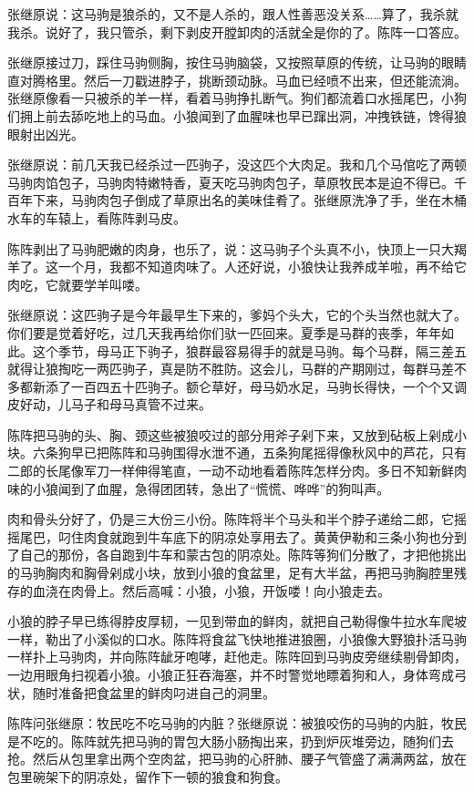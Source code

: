 \par 张继原说：这马驹是狼杀的，又不是人杀的，跟人性善恶没关系……算了，我杀就我杀。说好了，我只管杀，剩下剥皮开膛卸肉的活就全是你的了。陈阵一口答应。
\par 张继原接过刀，踩住马驹侧胸，按住马驹脑袋，又按照草原的传统，让马驹的眼睛直对腾格里。然后一刀戳进脖子，挑断颈动脉。马血已经喷不出来，但还能流淌。张继原像看一只被杀的羊一样，看着马驹挣扎断气。狗们都流着口水摇尾巴，小狗们拥上前去舔吃地上的马血。小狼闻到了血腥味也早已蹿出洞，冲拽铁链，馋得狼眼射出凶光。
\par 张继原说：前几天我已经杀过一匹驹子，没这匹个大肉足。我和几个马倌吃了两顿马驹肉馅包子，马驹肉特嫩特香，夏天吃马驹肉包子，草原牧民本是迫不得已。千百年下来，马驹肉包子倒成了草原出名的美味佳肴了。张继原洗净了手，坐在木桶水车的车辕上，看陈阵剥马皮。
\par 陈阵剥出了马驹肥嫩的肉身，也乐了，说：这马驹子个头真不小，快顶上一只大羯羊了。这一个月，我都不知道肉味了。人还好说，小狼快让我养成羊啦，再不给它肉吃，它就要学羊叫喽。
\par 张继原说：这匹驹子是今年最早生下来的，爹妈个头大，它的个头当然也就大了。你们要是觉着好吃，过几天我再给你们驮一匹回来。夏季是马群的丧季，年年如此。这个季节，母马正下驹子，狼群最容易得手的就是马驹。每个马群，隔三差五就得让狼掏吃一两匹驹子，真是防不胜防。这会儿，马群的产期刚过，每群马差不多都新添了一百四五十匹驹子。额仑草好，母马奶水足，马驹长得快，一个个又调皮好动，儿马子和母马真管不过来。
\par 陈阵把马驹的头、胸、颈这些被狼咬过的部分用斧子剁下来，又放到砧板上剁成小块。六条狗早已把陈阵和马驹围得水泄不通，五条狗尾摇得像秋风中的芦花，只有二郎的长尾像军刀一样伸得笔直，一动不动地看着陈阵怎样分肉。多日不知新鲜肉味的小狼闻到了血腥，急得团团转，急出了“慌慌、哗哗”的狗叫声。
\par 肉和骨头分好了，仍是三大份三小份。陈阵将半个马头和半个脖子递给二郎，它摇摇尾巴，叼住肉食就跑到牛车底下的阴凉处享用去了。黄黄伊勒和三条小狗也分到了自己的那份，各自跑到牛车和蒙古包的阴凉处。陈阵等狗们分散了，才把他挑出的马驹胸肉和胸骨剁成小块，放到小狼的食盆里，足有大半盆，再把马驹胸腔里残存的血浇在肉骨上。然后高喊：小狼，小狼，开饭喽！向小狼走去。
\par 小狼的脖子早已练得脖皮厚韧，一见到带血的鲜肉，就把自己勒得像牛拉水车爬坡一样，勒出了小溪似的口水。陈阵将食盆飞快地推进狼圈，小狼像大野狼扑活马驹一样扑上马驹肉，并向陈阵龇牙咆哮，赶他走。陈阵回到马驹皮旁继续剔骨卸肉，一边用眼角扫视着小狼。小狼正狂吞海塞，并不时警觉地瞟着狗和人，身体弯成弓状，随时准备把食盆里的鲜肉叼进自己的洞里。
\par 陈阵问张继原：牧民吃不吃马驹的内脏？张继原说：被狼咬伤的马驹的内脏，牧民是不吃的。陈阵就先把马驹的胃包大肠小肠掏出来，扔到炉灰堆旁边，随狗们去抢。然后从包里拿出两个空肉盆，把马驹的心肝肺、腰子气管盛了满满两盆，放在包里碗架下的阴凉处，留作下一顿的狼食和狗食。
